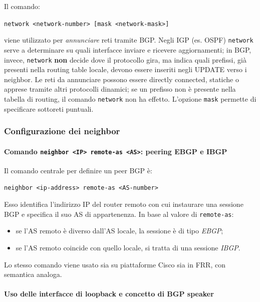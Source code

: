 Il comando:
\begin{center}
    \texttt{network <network-number> [mask <network-mask>]}
\end{center}
viene utilizzato per \emph{annunciare} reti tramite BGP. Negli IGP (es. OSPF) \texttt{network} serve a determinare su quali interfacce inviare e ricevere aggiornamenti; in BGP, invece, \texttt{network} \textbf{non} decide dove il protocollo gira, ma indica quali prefissi, già presenti nella routing table locale, devono essere inseriti negli UPDATE verso i neighbor. Le reti da annunciare possono essere directly connected, statiche o apprese tramite altri protocolli dinamici; se un prefisso non è presente nella tabella di routing, il comando \texttt{network} non ha effetto. L’opzione \texttt{mask} permette di specificare sottoreti puntuali.

\subsubsection{Configurazione dei neighbor}

\paragraph{Comando \texttt{neighbor <IP> remote-as <AS>}: peering EBGP e IBGP}

Il comando centrale per definire un peer BGP è:
\begin{center}
    \texttt{neighbor <ip-address> remote-as <AS-number>}
\end{center}
Esso identifica l’indirizzo IP del router remoto con cui instaurare una sessione BGP e specifica il suo AS di appartenenza. In base al valore di \texttt{remote-as}:
\begin{itemize}
    \item se l’AS remoto è diverso dall’AS locale, la sessione è di tipo \emph{EBGP};
    \item se l’AS remoto coincide con quello locale, si tratta di una sessione \emph{IBGP}.
\end{itemize}
Lo stesso comando viene usato sia su piattaforme Cisco sia in FRR, con semantica analoga.

\paragraph{Uso delle interfacce di loopback e concetto di BGP speaker}

